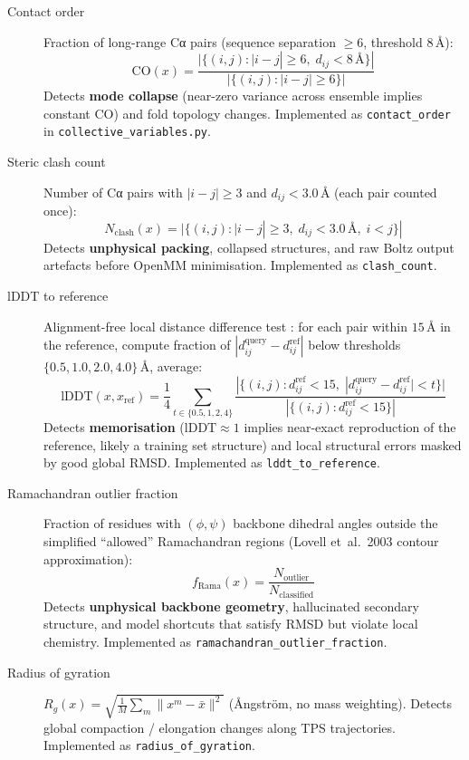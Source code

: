 \documentclass[11pt,a4paper]{article}
\begin{document}
\begin{description}
  \item[Contact order]
    Fraction of long-range Cα pairs (sequence separation $\geq 6$,
    threshold $8\,\text{\AA}$):
    \[
      \mathrm{CO}(x) = \frac{|\{(i,j): |i-j|\geq 6,\; d_{ij}<8\,\text{\AA}\}|}
                            {|\{(i,j): |i-j|\geq 6\}|}
    \]
    Detects \textbf{mode collapse} (near-zero variance across ensemble implies
    constant CO) and fold topology changes.  Implemented as
    \texttt{contact\_order} in \texttt{collective\_variables.py}.

  \item[Steric clash count]
    Number of Cα pairs with $|i-j|\geq 3$ and $d_{ij}<3.0\,\text{\AA}$
    (each pair counted once):
    \[
      N_{\mathrm{clash}}(x) = |\{(i,j): |i-j|\geq 3,\; d_{ij}<3.0\,\text{\AA},\; i<j\}|
    \]
    Detects \textbf{unphysical packing}, collapsed structures, and raw Boltz
    output artefacts before OpenMM minimisation.  Implemented as
    \texttt{clash\_count}.

  \item[lDDT to reference]
    Alignment-free local distance difference test \cite{Mariani2013}:
    for each pair within $15\,\text{\AA}$ in the reference,
    compute fraction of $|d^{\mathrm{query}}_{ij}-d^{\mathrm{ref}}_{ij}|$
    below thresholds $\{0.5, 1.0, 2.0, 4.0\}\,\text{\AA}$, average:
    \[
      \mathrm{lDDT}(x, x_{\mathrm{ref}}) =
        \frac{1}{4}\sum_{t\in\{0.5,1,2,4\}}
        \frac{|\{(i,j): d^{\mathrm{ref}}_{ij}<15,\;
              |d^{\mathrm{query}}_{ij}-d^{\mathrm{ref}}_{ij}|<t\}|}
             {|\{(i,j): d^{\mathrm{ref}}_{ij}<15\}|}
    \]
    Detects \textbf{memorisation} ($\mathrm{lDDT}\approx 1$ implies
    near-exact reproduction of the reference, likely a training set structure)
    and local structural errors masked by good global RMSD.  Implemented as
    \texttt{lddt\_to\_reference}.

  \item[Ramachandran outlier fraction]
    Fraction of residues with $(\phi,\psi)$ backbone dihedral angles outside
    the simplified ``allowed'' Ramachandran regions
    (Lovell et~al.\ 2003 contour approximation):
    \[
      f_{\mathrm{Rama}}(x) = \frac{N_{\mathrm{outlier}}}{N_{\mathrm{classified}}}
    \]
    Detects \textbf{unphysical backbone geometry}, hallucinated secondary
    structure, and model shortcuts that satisfy RMSD but violate local
    chemistry.  Implemented as \texttt{ramachandran\_outlier\_fraction}.

  \item[Radius of gyration]
    $R_g(x) = \sqrt{\frac{1}{M}\sum_m \|x^m - \bar x\|^2}$
    (Ångström, no mass weighting).
    Detects global compaction / elongation changes along TPS trajectories.
    Implemented as \texttt{radius\_of\_gyration}.
\end{description}
\end{document}
